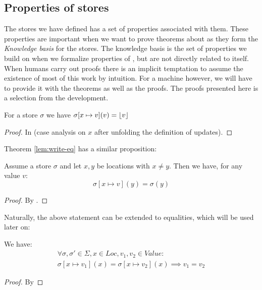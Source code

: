 \subsection{Properties of stores}

The stores we have defined has a set of properties associated with
them. These properties are important when we want to prove theorems
about \janusz{} as they form the \emph{Knowledge basis} for the
stores. The knowledge basis is the set of properties we build on when
we formalize properties of \janusz{}, but are not directly related to
\janusz{} itself. When humans carry out proofs there is an implicit
temptation to assume the existence of most of this work by
intuition. For a machine however, we will have to provide it with the
theorems as well as the proofs. The proofs presented here is a
selection from the development.

\begin{lem}
  \label{lem:write-eq}
  For a store $\sigma$ we have $\sigma[x \mapsto v](v) = \lfloor v \rfloor$
\end{lem}
\begin{proof}
  In \coq{} (case analysis on $x$ after unfolding the definition of updates).
\end{proof}
Theorem \ref{lem:write-eq} has a similar proposition:
\begin{lem}
  Assume a store $\sigma$ and let $x, y$ be locations with $x \neq
  y$. Then we have, for any value $v$:
  \begin{equation*}
    \sigma[x \mapsto v](y) = \sigma(y)
  \end{equation*}
\end{lem}
\begin{proof}
  By \coq{}.
\end{proof}

Naturally, the above statement can be extended to equalities, which
will be used later on:
\begin{lem}
\label{lem:write-eq2}
  We have:
  \begin{multline*}
    \forall \sigma, \sigma' \in \Sigma, x \in Loc, v_1, v_2 \in Value
    \colon \\
    \sigma[x \mapsto v_1](x) = \sigma[x \mapsto v_2](x) \implies v_1 = v_2
  \end{multline*}
\end{lem}
\begin{proof}
  By \coq{}
\end{proof}

